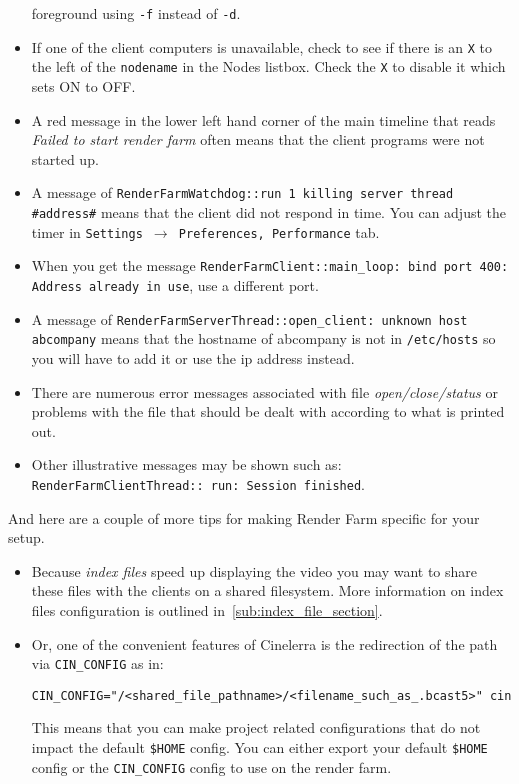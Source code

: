 \begin{itemize}
  foreground using \texttt{-f} instead of \texttt{-d}.
\item If one of the client computers is unavailable, check to see if
  there is an \texttt{X} to the left of the \texttt{nodename} in the
  Nodes listbox.  Check the \texttt{X} to disable it which sets ON to
  OFF.
\item A red message in the lower left hand corner of the main
  timeline that reads \textit{Failed to start render farm} often means
  that the client \CGG{} programs were not started up.
\item A message of \texttt{RenderFarmWatchdog::run 1 killing server
    thread \\ \#address\#} means that the client did not respond in
  time.  You can adjust the timer in \texttt{Settings $\rightarrow$
    Preferences, Performance} tab.
\item When you get the message \texttt{RenderFarmClient::main\_loop:
    bind port 400: Address already in use}, use a different port.
\item A message of \texttt{RenderFarmServerThread::open\_client:
    unknown host abcompany} means that the hostname of abcompany is not
  in \texttt{/etc/hosts} so you will have to add it or use the ip
  address instead.
\item There are numerous error messages associated with file
  \textit{open/close/status} or problems with the file that should be
  dealt with according to what is printed out.
\item Other illustrative messages may be shown such as:
  \texttt{RenderFarmClientThread:: run: Session finished}.
\end{itemize}

And here are a couple of more tips for making Render Farm specific
for your setup.
\begin{itemize}
\item Because \textit{index files} speed up displaying the video you
  may want to share these files with the clients on a shared
  filesystem. More information on index files configuration is
  outlined in~\ref{sub:index_file_section}.
\item Or, one of the convenient features of Cinelerra is the
  redirection of the path via \texttt{CIN\_CONFIG} as in:
\begin{lstlisting}[style=sh]
CIN_CONFIG="/<shared_file_pathname>/<filename_such_as_.bcast5>" cin
\end{lstlisting} This means that you can make project related
  configurations that do not impact the default \texttt{\$HOME}
  config.  You can either export your default \texttt{\$HOME} config
  or the \texttt{CIN\_CONFIG} config to use on the render farm.
\end{itemize}

